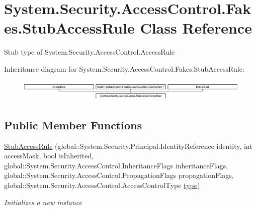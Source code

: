 \hypertarget{class_system_1_1_security_1_1_access_control_1_1_fakes_1_1_stub_access_rule}{\section{System.\-Security.\-Access\-Control.\-Fakes.\-Stub\-Access\-Rule Class Reference}
\label{class_system_1_1_security_1_1_access_control_1_1_fakes_1_1_stub_access_rule}
}


Stub type of System.\-Security.\-Access\-Control.\-Access\-Rule 


Inheritance diagram for System.\-Security.\-Access\-Control.\-Fakes.\-Stub\-Access\-Rule\-:\begin{figure}[H]
\begin{center}
\leavevmode
\includegraphics[height=1.039926cm]{class_system_1_1_security_1_1_access_control_1_1_fakes_1_1_stub_access_rule}
\end{center}
\end{figure}
\subsection*{Public Member Functions}
\begin{DoxyCompactItemize}
\item 
\hyperlink{class_system_1_1_security_1_1_access_control_1_1_fakes_1_1_stub_access_rule_a5ffb8e22137fb4651ca70ec87fa5f711}{Stub\-Access\-Rule} (global\-::\-System.\-Security.\-Principal.\-Identity\-Reference identity, int access\-Mask, bool is\-Inherited, global\-::\-System.\-Security.\-Access\-Control.\-Inheritance\-Flags inheritance\-Flags, global\-::\-System.\-Security.\-Access\-Control.\-Propagation\-Flags propagation\-Flags, global\-::\-System.\-Security.\-Access\-Control.\-Access\-Control\-Type \hyperlink{jquery-1_810_82-vsdoc_8js_a3940565e83a9bfd10d95ffd27536da91}{type})
\begin{DoxyCompactList}\small\item\em Initializes a new instance\end{DoxyCompactList}\end{DoxyCompactItemize}

